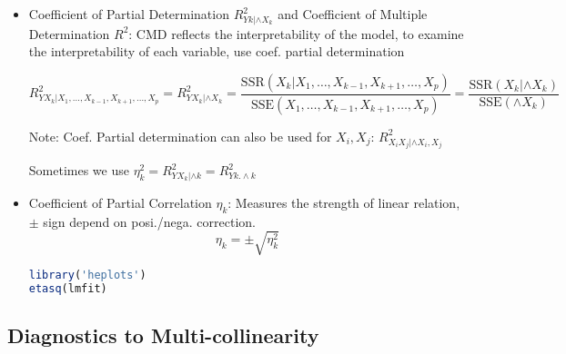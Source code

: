 \begin{itemize}[topsep=2pt,itemsep=2pt]
\item Coefficient of Partial Determination $ R^2_{Yk|\wedge X_k} $ and Coefficient of Multiple Determination $ R^2 $:
    CMD reflects the interpretability of the model, to examine the interpretability of each variable, use coef. partial determination

\begin{equation}
    R^2_{YX_k|X_1,\ldots,X_{k-1},X_{k+1},\ldots,X_p}=R^2_{YX_k|\wedge X_k}=\dfrac{\mathrm{SSR}(X_k|X_1,\ldots,X_{k-1},X_{k+1},\ldots,X_p) }{\mathrm{SSE}(X_1,\ldots,X_{k-1},X_{k+1},\ldots,X_p) }=\dfrac{\mathrm{SSR}(X_k|\wedge X_k) }{\mathrm{SSE}(\wedge X_k) }
\end{equation}

    Note: Coef. Partial determination can also be used for $ X_i,X_j $: $ R^2_{X_iX_j|\wedge X_i,X_j} $

    Sometimes we use $ \eta^2_k=R^2_{YX_k|\wedge k}=R^2_{Yk.\wedge k} $

    \item Coefficient of Partial Correlation $ \eta_k $: Measures the strength of linear relation, $ \pm $ sign depend on posi./nega. correction.
    \begin{equation}
        \eta_k=\pm \sqrt{\eta^2_k} 
    \end{equation}
    
    
\begin{rcode}
\begin{lstlisting}[language=R]
library('heplots')
etasq(lmfit)
\end{lstlisting}

\end{rcode}

\end{itemize}











\subsection{Diagnostics to Multi-collinearity}\label{SubSubSectionDiagnosticsToMultiCollinearity}
    
